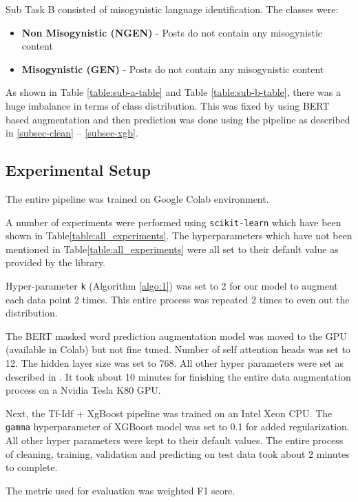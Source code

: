 \documentclass[conference]{IEEEtran}
\begin{document}
Sub Task B consisted of misogynistic language identification. The classes were:
\begin{itemize}
    \item \textbf{Non Misogynistic (NGEN)} - Posts do not contain any misogynistic content
    \item \textbf{Misogynistic (GEN)} - Posts do not contain any misogynistic content
\end{itemize}

As shown in Table \eqref{table:sub-a-table} and Table \eqref{table:sub-b-table}, there was a huge imbalance in terms of class distribution. This was fixed by using BERT based augmentation and then prediction was done using the pipeline as described in \eqref{subsec-clean} -- \eqref{subsec-xgb}.

\subsection{Experimental Setup}
The entire pipeline was trained on Google Colab environment.

A number of experiments were performed using \texttt{scikit-learn} \cite{scikit-learn} which have been shown in Table\eqref{table:all_experiments}. 
The hyperparameters which have not been mentioned in Table\eqref{table:all_experiments} were all set to their default value as provided by the library.

Hyper-parameter \texttt{k} (Algorithm \eqref{algo:1}) was set to 2 for our model to augment each data point 2 times. 
This entire process was repeated 2 times to even out the distribution.

The BERT masked word prediction augmentation model was moved to the GPU (available in Colab) but not fine tuned. Number of self attention heads was set to 12. The hidden layer size was set to 768. All other hyper parameters were set as described in \cite{DBLP:journals/corr/abs-1810-04805}. It took about 10 minutes for finishing the entire data augmentation process on a Nvidia Tesla K80 GPU.

Next, the Tf-Idf + XgBoost pipeline was trained on an Intel Xeon CPU. The \texttt{gamma} hyperparameter of XGBoost model was set to 0.1 for added regularization. All other hyper parameters were kept to their default values. The entire process of cleaning, training, validation and predicting on test data took about 2 minutes to complete.

The metric used for evaluation was weighted F1 score.
\end{document}
